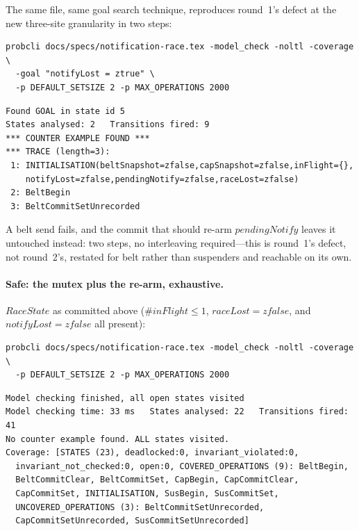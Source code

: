 \documentclass[a4paper,10pt,fleqn]{article}
\begin{document}
The same file, same goal search technique, reproduces round~1's defect
at the new three-site granularity in two steps:

\begin{verbatim}
probcli docs/specs/notification-race.tex -model_check -noltl -coverage \
  -goal "notifyLost = ztrue" \
  -p DEFAULT_SETSIZE 2 -p MAX_OPERATIONS 2000
\end{verbatim}

\begin{verbatim}
Found GOAL in state id 5
States analysed: 2   Transitions fired: 9
*** COUNTER EXAMPLE FOUND ***
*** TRACE (length=3):
 1: INITIALISATION(beltSnapshot=zfalse,capSnapshot=zfalse,inFlight={},
    notifyLost=zfalse,pendingNotify=zfalse,raceLost=zfalse)
 2: BeltBegin
 3: BeltCommitSetUnrecorded
\end{verbatim}

A belt send fails, and the commit that should re-arm $pendingNotify$
leaves it untouched instead: two steps, no interleaving required---this
is round~1's defect, not round~2's, restated for belt rather than
suspenders and reachable on its own.

\paragraph{Safe: the mutex plus the re-arm, exhaustive.}  $RaceState$ as
committed above ($\# inFlight \leq 1$, $raceLost = zfalse$, and
$notifyLost = zfalse$ all present):

\begin{verbatim}
probcli docs/specs/notification-race.tex -model_check -noltl -coverage \
  -p DEFAULT_SETSIZE 2 -p MAX_OPERATIONS 2000
\end{verbatim}

\begin{verbatim}
Model checking finished, all open states visited
Model checking time: 33 ms   States analysed: 22   Transitions fired: 41
No counter example found. ALL states visited.
Coverage: [STATES (23), deadlocked:0, invariant_violated:0,
  invariant_not_checked:0, open:0, COVERED_OPERATIONS (9): BeltBegin,
  BeltCommitClear, BeltCommitSet, CapBegin, CapCommitClear,
  CapCommitSet, INITIALISATION, SusBegin, SusCommitSet,
  UNCOVERED_OPERATIONS (3): BeltCommitSetUnrecorded,
  CapCommitSetUnrecorded, SusCommitSetUnrecorded]
\end{verbatim}
\end{document}
